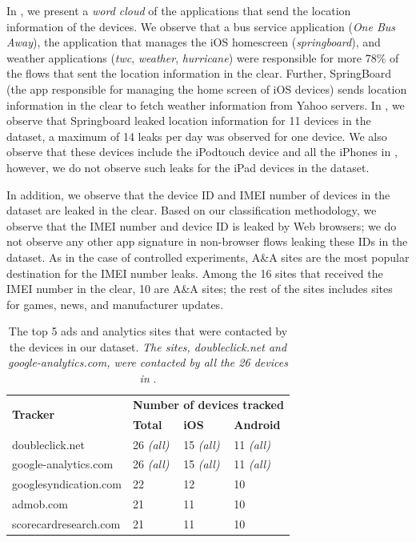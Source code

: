 In , we present a \emph{word cloud} of
the applications that send the location information of the devices.
We observe that a bus service application (\emph{One Bus Away}), the
application that manages the iOS homescreen (\emph{springboard}), and
weather applications (\emph{twc}, \emph{weather}, \emph{hurricane})
were responsible for more 78\% of the flows that sent the location
information in the clear. 
Further, SpringBoard (the app responsible for managing the home screen of iOS devices) sends location information in the clear to fetch weather information from Yahoo servers. 
In , we observe that Springboard leaked location information for 11 devices in the \mobWild dataset, a maximum of 14 leaks per day was observed for one device. 
We also observe that these devices include the iPodtouch device and all the iPhones in \mobWild, however, we do not observe such leaks for the iPad devices in the \mobWild dataset.  


In addition, we observe that the device ID and IMEI number of
devices in the \mobWild dataset are leaked in the clear.  Based on our
classification methodology, we observe that the IMEI number and device
ID is leaked by Web browsers; we do not observe any other app 
signature in non-browser flows leaking these IDs in the \mobWild dataset.  As in the case of
controlled experiments, A\&A sites are the most popular
destination for the IMEI number leaks.  Among the 16 sites that received 
the IMEI number in the clear, 10 are A\&A sites;
the rest of the sites includes sites for games, news, and manufacturer
updates.

\begin{table}
\centering
\begin{small}
\begin{tabular}{|p{}|p{}|p{}|p{}|}
\hline
\multirow{2}{*}{\bf Tracker} & \multicolumn{3}{c|}{\bf Number of devices tracked}\tabularnewline
\cline{2-4}
                      &  {\bf Total} & {\bf iOS} & {\bf Android} \tabularnewline
\hline
doubleclick.net       & 26 {\em(all)} & 15 {\em(all)} & 11 {\em(all)} \tabularnewline
\hline
google-analytics.com  & 26 {\em(all)} & 15 {\em(all)}  & 11 {\em(all)} \tabularnewline
\hline
googlesyndication.com & 22 & 12 & 10 \tabularnewline
\hline
admob.com             & 21 & 11 & 10 \tabularnewline
\hline
scorecardresearch.com &  21 & 11 & 10 \tabularnewline
\hline
\end{tabular}
\end{small}
\caption{The top 5 ads and analytics sites that were contacted by the devices in our dataset.
\emph{The sites, doubleclick.net and google-analytics.com, were contacted by all the 26 devices in} \mobWild.}
\label{tab:top-trackers}
\end{table}

